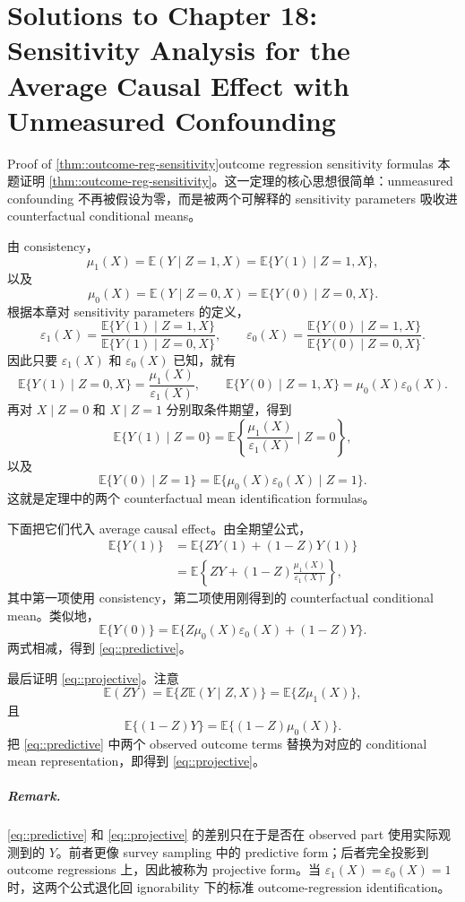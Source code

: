 \chapter{Solutions to Chapter 18: Sensitivity Analysis for the Average Causal Effect with Unmeasured Confounding}
\label{sol:chapter18}

\begin{exercisesolution}{Proof of \cref{thm::outcome-reg-sensitivity}}{outcome regression sensitivity formulas}
本题证明 \cref{thm::outcome-reg-sensitivity}。这一定理的核心思想很简单：unmeasured confounding 不再被假设为零，而是被两个可解释的 sensitivity parameters 吸收进 counterfactual conditional means。

由 consistency，
\[
\mu_1(X)=\mathbb{E}(Y\mid Z=1,X)=\mathbb{E}\{Y(1)\mid Z=1,X\},
\]
以及
\[
\mu_0(X)=\mathbb{E}(Y\mid Z=0,X)=\mathbb{E}\{Y(0)\mid Z=0,X\}.
\]
根据本章对 sensitivity parameters 的定义，
\[
\varepsilon_1(X)
=
\frac{\mathbb{E}\{Y(1)\mid Z=1,X\}}
     {\mathbb{E}\{Y(1)\mid Z=0,X\}},
\qquad
\varepsilon_0(X)
=
\frac{\mathbb{E}\{Y(0)\mid Z=1,X\}}
     {\mathbb{E}\{Y(0)\mid Z=0,X\}}.
\]
因此只要 $\varepsilon_1(X)$ 和 $\varepsilon_0(X)$ 已知，就有
\[
\mathbb{E}\{Y(1)\mid Z=0,X\}
=\frac{\mu_1(X)}{\varepsilon_1(X)},
\qquad
\mathbb{E}\{Y(0)\mid Z=1,X\}
=\mu_0(X)\varepsilon_0(X).
\]
再对 $X\mid Z=0$ 和 $X\mid Z=1$ 分别取条件期望，得到
\[
\mathbb{E}\{Y(1)\mid Z=0\}
=
\mathbb{E}\left\{\frac{\mu_1(X)}{\varepsilon_1(X)}\mid Z=0\right\},
\]
以及
\[
\mathbb{E}\{Y(0)\mid Z=1\}
=
\mathbb{E}\{\mu_0(X)\varepsilon_0(X)\mid Z=1\}.
\]
这就是定理中的两个 counterfactual mean identification formulas。

下面把它们代入 average causal effect。由全期望公式，
\begin{align*}
\mathbb{E}\{Y(1)\}
&=
\mathbb{E}\{ZY(1)+(1-Z)Y(1)\}\\
&=
\mathbb{E}\left\{ZY+(1-Z)\frac{\mu_1(X)}{\varepsilon_1(X)}\right\},
\end{align*}
其中第一项使用 consistency，第二项使用刚得到的 counterfactual conditional mean。类似地，
\[
\mathbb{E}\{Y(0)\}
=
\mathbb{E}\{Z\mu_0(X)\varepsilon_0(X)+(1-Z)Y\}.
\]
两式相减，得到 \cref{eq::predictive}。

最后证明 \cref{eq::projective}。注意
\[
\mathbb{E}(ZY)
=
\mathbb{E}\{Z\mathbb{E}(Y\mid Z,X)\}
=
\mathbb{E}\{Z\mu_1(X)\},
\]
且
\[
\mathbb{E}\{(1-Z)Y\}
=
\mathbb{E}\{(1-Z)\mu_0(X)\}.
\]
把 \cref{eq::predictive} 中两个 observed outcome terms 替换为对应的 conditional mean representation，即得到 \cref{eq::projective}。

\paragraph{Remark.}
\cref{eq::predictive} 和 \cref{eq::projective} 的差别只在于是否在 observed part 使用实际观测到的 $Y$。前者更像 survey sampling 中的 predictive form；后者完全投影到 outcome regressions 上，因此被称为 projective form。当 $\varepsilon_1(X)=\varepsilon_0(X)=1$ 时，这两个公式退化回 ignorability 下的标准 outcome-regression identification。
\end{exercisesolution}

